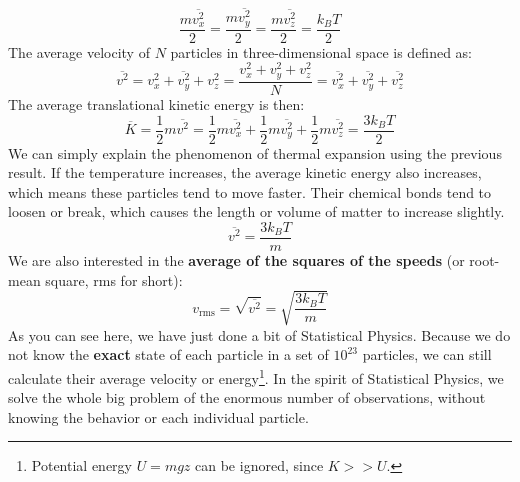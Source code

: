 \documentclass[~/PhyAI/phyai.tex]{subfiles}
\begin{document}
$$ \frac{m\overline{v_{x}^{2}}}{2}=\frac{m\overline{v_{y}^{2}}}{2}=\frac{m\overline{v_{z}^{2}}}{2}=\frac{k_{B}T} {2} $$
The average velocity of $N$ particles in three-dimensional space is defined as:
$$ \overline{v^{2}}=\overline{v_{x}^{2}+v_{y}^{2}+v_{z}^{2}}=\frac{v_{x}^{2}+v_{y}^{2}+v_{z}^{2}}{N}=\overline{v_{x}^{2}}+\overline{v_{y}^{2}}+\overline{v_{z}^{2}} $$
The average translational kinetic energy is then:
$$ \overline{K}=\frac{1 }{2}m\overline{v^{2}}=\frac{1 }{2}m\overline{v_{x}^{2}}+\frac{1 }{2}m\overline{v_{y}^{2}}+\frac{1 }{2}m\overline{v_{z}^{2}}=\frac{3k_{B}T}{2} $$
We can simply explain the phenomenon of thermal expansion using the previous result. If the temperature increases, the average kinetic energy also increases, which means these particles tend to move faster. Their chemical bonds tend to loosen or break, which causes the length or volume of matter to increase slightly.
\begin{equation*}
	\overline{v^{2}}=\frac{3k_{B}T }{m}
\end{equation*}
We are also interested in the \textbf{average of the squares of the speeds} (or root-mean square, rms for short):
\begin{equation*}
	v_{\text{rms}}=\sqrt{\overline{v^{2}}}=\sqrt{\frac{3k_{B}T }{m}}
\end{equation*}
As you can see here, we have just done a bit of Statistical Physics. Because we do not know the \textbf{exact} state of each particle in a set of $10^{23}$ particles, we can still calculate their average velocity or energy\footnote[1]{Potential energy $U=mgz$ can be ignored, since $K>>U$.}. In the spirit of Statistical Physics, we solve the whole big problem of the enormous number of observations, without knowing the behavior or each individual particle.
\end{document}
